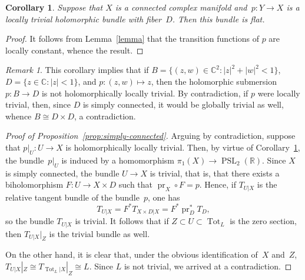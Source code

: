 \documentclass[11pt]{amsart}
\newcommand*{\C}{{\mathbb C}}
\newcommand*{\R}{{\mathbb R}}
\DeclareMathOperator{\pr}{pr}
\DeclareMathOperator{\PSL}{PSL}
\DeclareMathOperator{\Tot}{Tot}
\newtheorem{corollary}[proposition]{Corollary}
\theoremstyle{remark}
\newtheorem{remark}[proposition]{Remark}
\theoremstyle{definition}
\begin{document}
\begin{corollary}\label{corollary}
Suppose that $X$ is a connected complex manifold and~$p\colon Y\to
X$ is a locally trivial holomorphic bundle with fiber~$D$. Then this
bundle is flat.
\end{corollary}

\begin{proof}
It follows from Lemma~\ref{lemma} that the transition functions of $p$
are locally constant, whence the result.  
\end{proof}

\begin{remark}\label{remark}
This corollary implies that if $B=\{(z,w)\in\C^2\colon
|z|^2+|w|^2<1\}$, $D=\{z\in\C\colon |z|<1\}$, and $p\colon
(z,w)\mapsto z$, then the holomorphic submersion~$p\colon B\to D$ is
not holomorphically locally trivial.  By contradiction, if $p$ were
locally trivial, then, since $D$ is simply connected, it would be
globally trivial as well, whence $B\cong D\times D$, a contradiction.
\end{remark}

\begin{proof}[Proof of Proposition~\ref{prop:simply-connected}]
Arguing by contradiction, suppose that $p|_U\colon U\to X$ is holomorphically
locally trivial. Then, by virtue of Corollary~\ref{corollary},
the bundle~$p|_U$ is induced
by a homomorphism $\pi_1(X)\to\PSL_2(\R)$.
Since $X$ is simply connected, the bundle $U\to X$ is
trivial, that is, that there exists a biholomorphism $F\colon U\to X\times
D$ such that $\pr_X\circ F=p$. Hence, if $T_{U|X}$ is the relative
tangent bundle of the bundle~$p$, one has
\begin{equation*}
T_{U|X}=F^*T_{X\times D|X}=F^*\pr_D^*T_D,  
\end{equation*}
so the bundle $T_{U|X}$ is trivial. It follows that if $Z\subset
U\subset \Tot_L$ is the zero section, then $T_{U|X}|_Z$ is the trivial
bundle as well.

On the other hand, it is clear that, under the obvious identification
of~$X$ and~$Z$, $T_{U|X}|_Z\cong T_{\Tot_L|X}|_Z\cong L$.
Since $L$ is not trivial, we arrived at a
contradiction. 
\end{proof}
\end{document}
